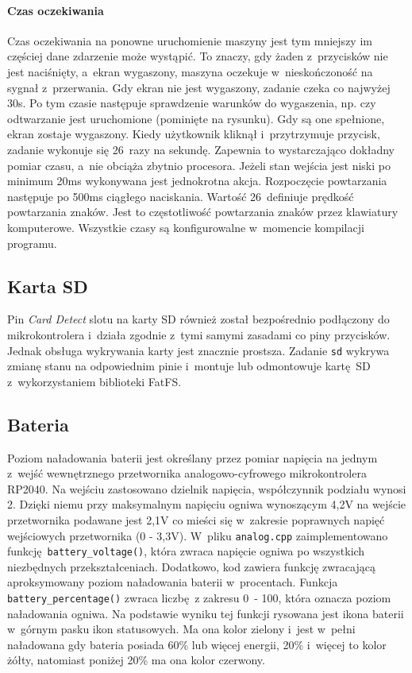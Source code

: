 \documentclass[polish]{aghengthesis}
\begin{document}
			\paragraph{Czas oczekiwania}
				Czas oczekiwania na ponowne uruchomienie maszyny jest tym mniejszy im częściej dane zdarzenie może wystąpić. To znaczy, gdy żaden z~przycisków nie jest naciśnięty, a~ekran wygaszony, maszyna oczekuje w~nieskończoność na sygnał z~przerwania. Gdy ekran nie jest wygaszony, zadanie czeka co najwyżej 30s. Po tym czasie następuje sprawdzenie warunków do wygaszenia, np. czy odtwarzanie jest uruchomione (pominięte na rysunku). Gdy są one spełnione, ekran zostaje wygaszony. Kiedy użytkownik kliknął i~przytrzymuje przycisk, zadanie wykonuje się 26~razy na sekundę. Zapewnia to wystarczająco dokładny pomiar czasu, a~nie obciąża zbytnio procesora. Jeżeli stan wejścia jest niski po minimum 20ms wykonywana jest jednokrotna akcja. Rozpoczęcie powtarzania następuje po 500ms ciągłego naciskania. Wartość 26~definiuje prędkość powtarzania znaków. Jest to częstotliwość powtarzania znaków przez klawiatury komputerowe. Wszystkie czasy są konfigurowalne w~momencie kompilacji programu.
		
		\subsection{Karta SD}
			Pin \textit{Card Detect} slotu na karty SD również został bezpośrednio podłączony do mikrokontrolera i~działa zgodnie z~tymi samymi zasadami co piny przycisków. Jednak obsługa wykrywania karty jest znacznie prostsza. Zadanie \lstinline|sd| wykrywa zmianę stanu na odpowiednim pinie i~montuje lub odmontowuje kartę SD z~wykorzystaniem biblioteki FatFS.
			
		\subsection{Bateria}
			Poziom naładowania baterii jest określany przez pomiar napięcia na jednym z~wejść wewnętrznego przetwornika analogowo-cyfrowego mikrokontrolera RP2040.
			Na wejściu zastosowano dzielnik napięcia, współczynnik podziału wynosi 2.
			Dzięki niemu przy maksymalnym napięciu ogniwa wynoszącym 4,2V na wejście przetwornika podawane jest 2,1V co mieści się w~zakresie poprawnych napięć wejściowych przetwornika (0 - 3,3V).
			W~pliku \lstinline|analog.cpp| zaimplementowano funkcję \lstinline|battery_voltage()|, która zwraca napięcie ogniwa po wszystkich niezbędnych przekształceniach. Dodatkowo, kod zawiera funkcję zwracającą aproksymowany poziom naładowania baterii w~procentach. Funkcja \lstinline|battery_percentage()| zwraca liczbę z zakresu 0~- 100, która oznacza poziom naładowania ogniwa. Na podstawie wyniku tej funkcji rysowana jest ikona baterii w~górnym pasku ikon statusowych. Ma ona kolor zielony i~jest w~pełni naładowana gdy bateria posiada 60\% lub więcej energii, 20\% i~więcej to kolor żółty, natomiast poniżej 20\% ma ona kolor czerwony.
		
\end{document}
